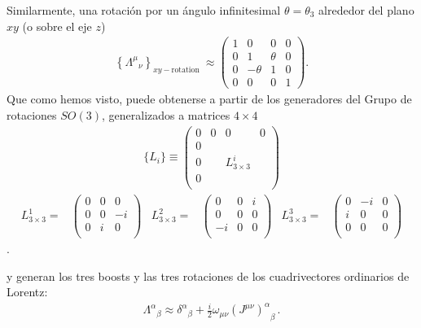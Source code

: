 \begin{frame}
  Similarmente, una rotación por un ángulo infinitesimal $\theta=\theta_3$ alrededor del plano $xy$ (o sobre el eje $z$)
\begin{align}
  \left\{{\Lambda^\mu}_{\nu}\right\}_{xy-\text{rotation }}\approx
  \begin{pmatrix}
    1&0&0&0\\
    0&1&\theta&0\\
    0&-\theta&1&0\\
    0&0&0&1
  \end{pmatrix}.
\end{align}
Que como hemos visto, puede obtenerse a partir de los generadores del Grupo de rotaciones $SO(3)$, generalizados a matrices $4\times4$
\begin{align}
  \{L_i\}\equiv
  \begin{pmatrix}
    0 & 0 & 0& 0\\
    0 &   &  &  \\
    0 &   & L^i_{3\times3}  &  \\
    0 &   &  &  \\
  \end{pmatrix}
\end{align}
\begin{align*}
  L^1_{3\times3}=&
  \begin{pmatrix}
   0 & 0 & 0\\
   0 & 0 & -i\\
   0 & i & 0 \\
  \end{pmatrix}&
 L^2_{3\times3}=&
 \begin{pmatrix}
  0 & 0  & i \\ 
  0 & 0  & 0 \\
 -i & 0  & 0 \\
 \end{pmatrix}&
 L^3_{3\times3}=&
 \begin{pmatrix}
   0 & -i & 0\\
   i & 0  & 0\\
   0 & 0 & 0\\
 \end{pmatrix}
\end{align*}.


\end{frame}
y generan los tres boosts y las tres rotaciones de los cuadrivectores ordinarios de Lorentz:
\begin{align}
  {\Lambda^\alpha}_\beta\approx{\delta^\alpha}_\beta+\frac{i}{2}\omega_{\mu\nu}{\left(J^{\mu\nu}\right)^\alpha}_\beta\,.
\end{align}

